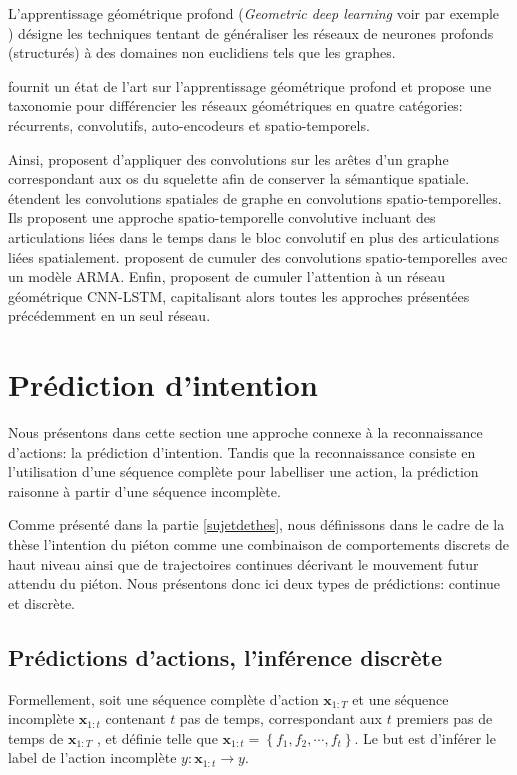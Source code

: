 L'apprentissage géométrique profond (\textit{Geometric deep learning} voir par exemple \\ \cite{gori2005new,scarselli2008graph,bronstein2017geometric}) désigne les techniques tentant de généraliser les réseaux de neurones profonds (structurés) à des domaines non euclidiens tels que les graphes. 

\cite{wu2019comprehensive} fournit un état de l'art sur l'apprentissage géométrique profond et propose une taxonomie pour différencier les réseaux géométriques en quatre catégories: récurrents, convolutifs, auto-encodeurs et spatio-temporels.

Ainsi, \cite{2018arXiv180506184Z} proposent d'appliquer des convolutions sur les arêtes d'un graphe correspondant aux os du squelette afin de conserver la sémantique spatiale.
\cite{yan2018spatial} étendent les convolutions spatiales de graphe en convolutions spatio-temporelles. Ils proposent une approche spatio-temporelle convolutive incluant des articulations liées dans le temps dans le bloc convolutif en plus des articulations liées spatialement. \cite{2018arXiv180209834L} proposent de cumuler des convolutions spatio-temporelles avec un modèle ARMA. Enfin,  \cite{Si_2019_CVPR} proposent de cumuler l'attention à un réseau géométrique CNN-LSTM, capitalisant alors toutes les approches présentées précédemment en un seul réseau.

\section{Prédiction d'intention}
Nous présentons dans cette section une approche connexe à la reconnaissance d'actions: la prédiction d'intention. Tandis que la reconnaissance consiste en l'utilisation d'une séquence complète pour labelliser une action, la prédiction raisonne à partir d'une séquence incomplète. 

Comme présenté dans la partie \ref{sujetdethes}, nous définissons dans le cadre de la thèse l'intention du piéton comme une combinaison de comportements discrets de haut niveau ainsi que de trajectoires continues décrivant le mouvement futur attendu du piéton. Nous présentons donc ici deux types de prédictions: continue et discrète.

\subsection{Prédictions d'actions, l'inférence discrète}
Formellement, soit une séquence complète d'action $\mathbf{x}_{1: T}$ et une séquence incomplète $\mathbf{x}_{1: t}$ contenant $t$ pas de temps, correspondant aux $t$ premiers pas de temps de $\mathbf{x}_{1: T}$ , et définie telle que $\mathbf{x}_{1: t}=\left\{f_{1}, f_{2}, \cdots, f_{t}\right\}$. Le but est d'inférer le label de l'action incomplète $y: \mathbf{x}_{1: t} \rightarrow y$.\\

